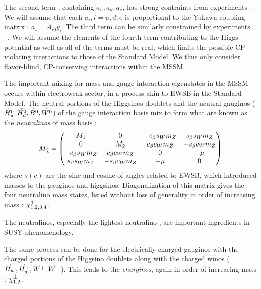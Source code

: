 The second term , containing $a_u,a_d,a_e$, has strong contraints from experiments ~\cite{Hisano:1995nq,Gabbiani:1996hi}.
We will assume that each $a_i, i = u,d,e$ is proportional to the Yukawa coupling matrix : $a_i = A_{i0} y_i$.
The third term  can be similarly constrained by experiments ~\cite{ Dimopoulos:1981zb, Gabbiani:1988rb, Hagelin:1992tc, Hagelin:1994id, Choudhury:1994pn, Barbieri:1994pv, deCarlos:1995ah, Casas:1996de,  Gabbiani:1996hi}.
We will assume the elements of the fourth term  contributing to the Higgs potential as well as all of the  terms must be real, which limits the possible CP-violating interactions to those of the Standard Model.
We thus only consider flavor-blind, CP-conserving interactions within the MSSM.

The important mixing for mass and gauge interaction eigenstates in the MSSM occurs within electroweak sector, in a process akin to EWSB in the Standard Model.
The neutral portions of the Higgsinos doublets and the neutral gauginos ($\tilde{H^0_u}, \tilde{H^0_d} ,\tilde{B^0}, \tilde{W^0}$) of the gauge interaction basis mix to form what are known as the \textit{neutralinos} of mass basis :
\begin{equation}
M_{\tilde{\chi}}=
\begin{pmatrix}
M_1              & 0                & -c_\beta s_W m_Z & s_\beta s_W m_Z  \\
0                & M_2              & c_\beta c_W m_Z  & -s_\beta c_W m_Z \\
-c_\beta s_W m_Z & c_\beta c_W m_Z  & 0                & -\mu             \\
s_\beta s_W m_Z  & -s_\beta c_W m_Z & -\mu             & 0                \\
\end{pmatrix}
\end{equation}
where $s (c)$ are the sine and cosine of angles related to EWSB, which introduced masses to the gauginos and higgsinos.
Diagonalization of this matrix gives the four neutralino mass states, listed without loss of generality in order of increasing mass : $\tilde{\chi^0_{1,2,3,4}}$.

The neutralinos, especially the lightest neutralino \lsp, are important ingredients in SUSY phenomenology.

The same process can be done for the electrically charged gauginos with the charged portions of the Higgsino doublets along with the charged winos ($\tilde{H^+_u}, \tilde{H^+_d}, \tilde{W^+}, \tilde{W^-}$).
This leads to the \textit{charginos}, again in order of increasing mass : $\tilde{\chi_{1,2}^\pm}$.


